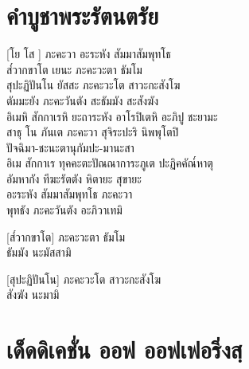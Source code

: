 \chapter*{คำบูชาพระรัตนตรัย}
\delegateSetUseNext

[โย โส ] ภะคะวา อะระหัง สัมมาสัมพุทโธ\\
ส๎วากขาโต เยนะ ภะคะวะตา ธัมโม\\
สุปะฏิปันโน  ยัสสะ ภะคะวะโต สาวะกะสังโฆ\\
ตัมมะยัง ภะคะวันตัง สะธัมมัง สะสังฆัง\\
อิเมหิ สักกาเรหิ ยะถาระหัง อาโรปิเตหิ อะภิปู ชะยามะ\\
สาธุ โน ภันเต ภะคะวา สุจิระปะริ นิพพุโตปิ\\
ปัจฉิมา-ชะนะตานุกัมปะ-มานะสา\\
อิเม สักกาเร ทุคคะตะปัณณาการะภูเต ปะฏิคคัณ๎หาตุ\\
อัมหากัง ทีฆะรัตตัง หิตายะ สุขายะ\\

อะระหัง สัมมาสัมพุทโธ ภะคะวา\\
พุทธัง ภะคะวันตัง อะภิวาเทมิ

[ส๎วากขาโต] ภะคะวะตา ธัมโม\\
ธัมมัง นะมัสสามิ 

[สุปะฏิปันโน] ภะคะวะโต สาวะกะสังโฆ\\
สังฆัง นะมามิ 
\clearpage

\chapter{เด็ดดิเคชั่น ออฟ ออฟเฟอริ่งสฺ}

